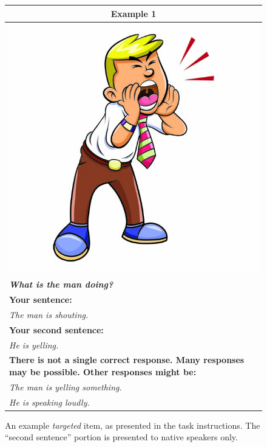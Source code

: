 \documentclass[12pt,notitlepage]{article}
\begin{document}
\begin{figure}[!htb]
\begin{center}
\begin{tabular}{|p{}|}
\hline
\multicolumn{1}{|c|}{\textbf{Example 1}}\\
\hline
\multicolumn{1}{|c|}{\includegraphics[width=0.4\columnwidth,trim=0 0 0 -3]{figures/ex02.jpg}}\\
\hline
\textbf{\textit{What is the man doing?}}\\
\hline
\textbf{Your sentence:} \\
\textit{The man is shouting.}\\
\hline
\textbf{Your second sentence:} \\
\textit{He is yelling.} \\
\hline
\textbf{There is not a single correct response. Many responses may be possible. Other responses might be:} \\
\textit{The man is yelling something.} \\
\textit{He is speaking loudly.} \\
\hline
\end{tabular}
\end{center}
\caption{An example \textit{targeted} item, as presented in the task instructions. The ``second sentence'' portion is presented to native speakers only.}
\label{fig:instructions1}
\end{figure}
\end{document}
